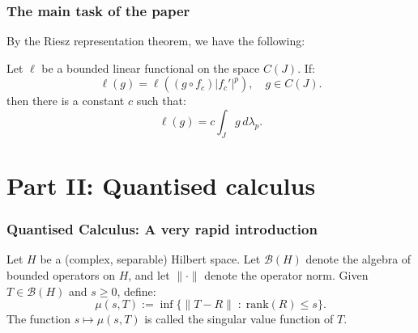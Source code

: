 \documentclass{beamer} %
\theoremstyle{definition} %
\begin{document}
% 
%     

\begin{frame}\frametitle{The main task of the paper}
    By the Riesz representation theorem, we have the following:
    \begin{theorem}
        Let $\ell$ be a bounded linear functional on the space $C(J)$. If:
        \begin{equation*}
            \ell(g) = \ell((g\circ f_c)|f_c'|^p),\quad g \in C(J).
        \end{equation*}
        then there is a constant $c$ such that:
        \begin{equation*}
            \ell(g) = c\int_{J} g\,d\lambda_p.
        \end{equation*}
    \end{theorem}
\end{frame}
\section{Part II: Quantised calculus}

\begin{frame}\frametitle{Quantised Calculus: A very rapid introduction}
    Let $H$ be a (complex, separable) Hilbert space. Let $\mathcal{B}(H)$ denote the algebra
    of bounded operators on $H$, and let $\|\cdot\|$ denote the operator norm. Given $T \in \mathcal{B}(H)$ and $s \geq 0$, define:
    \begin{equation*}
        \mu(s,T) := \inf\{\|T-R\|\;:\;\mathrm{rank}(R) \leq s\}.
    \end{equation*}
    The function $s\mapsto \mu(s,T)$ is called the singular value function of $T$.
\end{frame}
\end{document}

